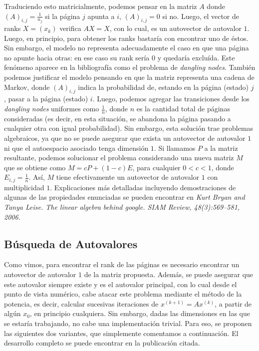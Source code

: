 Traduciendo esto matricialmente, podemos pensar en la matriz $A$ donde $(A)_{i,j} = \frac{1}{n_j}$ si la página $j$ apunta a $i$, $(A)_{i,j} =0$ si no. Luego, el vector de ranks $X = (x_k)$ verifica $AX = X$, con lo cual, es un autovector de autovalor $1$. Luego, en principio, para obtener los ranks bastaría con encontrar uno de éstos. Sin embargo, el modelo no representa adecuadamente el caso en que una página no apunte hacia otras: en ese caso su rank sería $0$ y quedaría excluída. Este fenómeno aparece en la bibliografía como el problema de \emph{dangling nodes}. También podemos justificar el modelo pensando en que la matriz representa una cadena de Markov, donde $(A)_{i,j}$ indica la probabilidad de, estando en la página (estado) $j$, pasar a la página (estado) $i$. Luego, podemos agregar las transiciones desde los \emph{dangling nodes} uniformes como  $\frac{1}{n}$, donde $n$ es la cantidad total de páginas consideradas (es decir, en esta situación, se abandona la página pasando a cualquier otra con igual probabilidad). Sin embargo, esta solución trae problemas algebraicos, ya que no se puede asegurar que exista un autovector de autovalor $1$ ni que el autoespacio asociado tenga dimensión $1$.  
Si  llamamos $P$ a la matriz resultante, podemos solucionar el problema considerando una nueva matriz $M$ que se obtiene como $M = cP + (1-c)E$, para cualquier $0<c<1$, donde $E_{i,j} = \frac{1}{n}$. Así, $M$ tiene efectivamente un autovector de autovalor $1$ con multiplicidad $1$. Explicaciones más detalladas incluyendo demostraciones de algunas de las propiedades enunciadas se pueden encontrar en \emph{Kurt Bryan and Tanya Leise. The linear algebra behind google. SIAM Review, 48(3):569–581, 2006.}

\subsection{Búsqueda de Autovalores}
Como vimos, para encontrar el rank de las páginas es necesario encontrar un autovector de autovalor $1$ de la matriz propuesta. Además, se puede asegurar que este autovalor siempre existe y es el autovalor principal, con lo cual desde el punto de vista numérico, cabe atacar este problema mediante el método de la potencia, es decir, calcular sucesivas iteraciones de $x^{(k+1)} = Ax^{(k)}$, a partir de algún $x_0$, en principio cualquiera.
Sin embargo, dadas las dimensiones en las que se estaría trabajando, no cabe una implementación trivial. Para eso, se proponen las siguientes dos variantes, que simplemente comentamos a continuación. El desarrollo completo se puede encontrar en la publicación citada.

